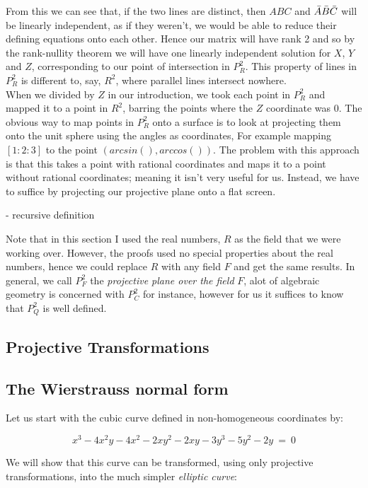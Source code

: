 \documentclass{article}
\begin{document}
From this we can see that, if the two lines are distinct, then $A  B  C$ and
$\Bar{A}  \Bar{B}  \Bar{C} $ will be linearly independent, as if they weren't, we would be able to reduce their defining equations onto each other. Hence our matrix will have rank 2 and so by the rank-nullity theorem we will have one linearly independent solution for $X$, $Y$ and $Z$, corresponding to our point of intersection in $P_R^2$. This property of lines in $P_R^2$ is different to, say, $R^2$, where parallel lines intersect nowhere.
\\
When we divided by $Z$ in our introduction, we took each point in $P_R^2$ and mapped it to a point in $R^2$, barring the points where the $Z$ coordinate was $0$. The obvious way to map points in $P_R^2$ onto a surface is to look at projecting them onto the unit sphere using the angles as coordinates, For example mapping $[1 : 2 : 3]$ to the point $(arcsin(), arccos())$. The problem with this approach is that this takes a point with rational coordinates and maps it to a point without rational coordinates; meaning it isn't very useful for us. Instead, we have to suffice by projecting our projective plane onto a flat screen.

- recursive definition

 Note that in this section I used the real numbers, $R$ as the field that we were working over. However, the proofs used no special properties about the real numbers, hence we could replace $R$ with any field $F$ and get the same results. In general, we call $P_F^2$ the \emph{projective plane over the field} $F$,  alot of algebraic geometry is concerned with $P_C^2$ for instance, however for us it suffices to know that $P_Q^2$ is well defined.

\subsection{Projective Transformations}



\subsection{The Wierstrauss normal form}

Let us start with the cubic curve defined in non-homogeneous coordinates by:

\[ x^{3} - 4 x^{2} y - 4 x^{2} - 2 x y^{2} - 2 x y - 3 y^{3} - 5 y^{2} - 2 y\ =\ 0 \]

We will show that this curve can be transformed, using only projective transformations, into the much simpler \emph{elliptic curve}:
\end{document}
